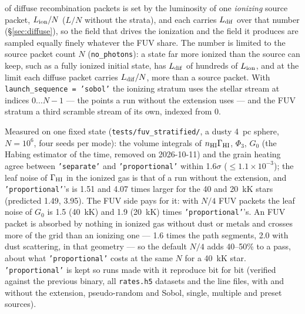 \documentclass[english,a4paper]{my_memo}
\newcommand{\code}[1]{\texttt{#1}}
\begin{document}
of diffuse recombination packets is set by the luminosity of one
\emph{ionizing} source packet, $L_{\rm ion}/N$ ($L/N$ without the strata),
and each carries $L_{\rm dif}$ over that number (\S\ref{sec:diffuse}), so
the field that drives the ionization and the field it produces are sampled
equally finely whatever the FUV share.  The number is limited to the source
packet count $N$ (\code{no\_photons}): a state far more ionized than the
source can keep, such as a fully ionized initial state, has $L_{\rm dif}$
of hundreds of $L_{\rm ion}$, and at the limit each diffuse packet carries
$L_{\rm dif}/N$, more than a source packet.  With \code{launch\_sequence = 'sobol'} the ionizing
stratum uses the stellar stream at indices $0\ldots N-1$ --- the points a
run without the extension uses --- and the FUV stratum a third scramble
stream of its own, indexed from 0.

Measured on one fixed state (\code{tests/fuv\_stratified/}, a dusty 4~pc
sphere, $N = 10^6$, four seeds per mode): the volume integrals of
$n_{\rm HI}\Gamma_{\rm HI}$, $\Phi_3$, $G_0$ (the Habing estimator of the time, removed on 2026-10-11) and the grain heating agree
between \code{'separate'} and \code{'proportional'} within 1.6$\sigma$
($\le 1.1\times10^{-3}$); the leaf noise of $\Gamma_{\rm HI}$ in the ionized
gas is that of a run without the extension, and \code{'proportional'}'s is
1.51 and 4.07 times larger for the 40 and 20~kK stars (predicted 1.49, 3.95).
The FUV side pays for it: with $N/4$ FUV packets the leaf noise of $G_0$ is
1.5 (40~kK) and 1.9 (20~kK) times \code{'proportional'}'s.  An FUV packet is
absorbed by nothing in ionized gas without dust or metals and crosses more
of the grid than an ionizing one --- 1.6 times the path segments, 2.0 with
dust scattering, in that geometry --- so the default $N/4$ adds 40--50\% to
a pass, about what \code{'proportional'} costs at the same $N$ for a 40~kK
star.  \code{'proportional'} is kept so runs made with it reproduce bit for
bit (verified against the previous binary, all \code{rates.h5} datasets and
the line files, with and without the extension, pseudo-random and Sobol,
single, multiple and preset sources).
\end{document}
